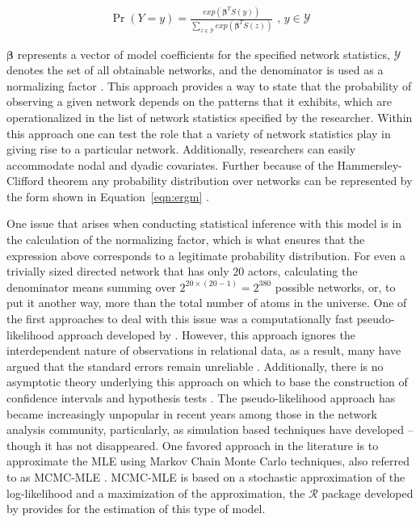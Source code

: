 \begin{align}
\Pr(Y = y) = \frac{ exp( \bm\beta^{T} S(y)  )  }{ \sum_{z \in \mathcal{Y}} exp( \bm\beta^{T} S(z)  )  } \text{ ,  } y \in \mathcal{Y}
\label{eqn:ergm}
\end{align}

$\bm\beta$ represents a vector of model coefficients for the specified network statistics, $\mathcal{Y}$ denotes the set of all obtainable networks, and the denominator is used as a normalizing factor \citep{hunter:etal:2008}. This approach provides a way to state that the probability of observing a given network depends on the patterns that it exhibits, which are operationalized in the list of network statistics specified by the researcher. Within this approach one can test the role that a variety of network statistics play in giving rise to a particular network. Additionally, researchers can easily accommodate nodal and dyadic covariates. Further because of the Hammersley-Clifford theorem any probability distribution over networks can be represented by the form shown in Equation~\ref{eqn:ergm} \citep{hammersley:clifford:1971}. 

One issue that arises when conducting statistical inference with this model is in the calculation of the normalizing factor, which is what ensures that the expression above corresponds to a legitimate probability distribution. For even a trivially sized directed network that has only $20$ actors, calculating the denominator means summing over $2^{20\times(20-1)} = 2^{380}$ possible networks, or, to put it another way, more than the total number of atoms in the universe. One of the first approaches to deal with this issue was a computationally fast pseudo-likelihood approach developed by \citet{strauss:iked:1990}. However, this approach ignores the interdependent nature of observations in relational data, as a result, many have argued that the standard errors remain unreliable \citep{lubbers:snijders:2007,robins:etal:2007a,vanduijn:etal:2009}. Additionally, there is no asymptotic theory underlying this approach on which to base the construction of confidence intervals and hypothesis tests \citep{kolaczyk:2009}. The pseudo-likelihood approach has became increasingly unpopular in recent years among those in the network analysis community, particularly, as simulation based techniques have developed -- though it has not disappeared. One favored approach in the literature is to approximate the MLE using Markov Chain Monte Carlo techniques, also referred to as MCMC-MLE \citep{geyer:thompson:1992,snijders:2002,handcock:2003b}. MCMC-MLE is based on a stochastic approximation of the log-likelihood and a maximization of the approximation, the  $\mathcal{R}$ package developed by \citet{hunter:etal:2008} provides for the estimation of this type of model.


